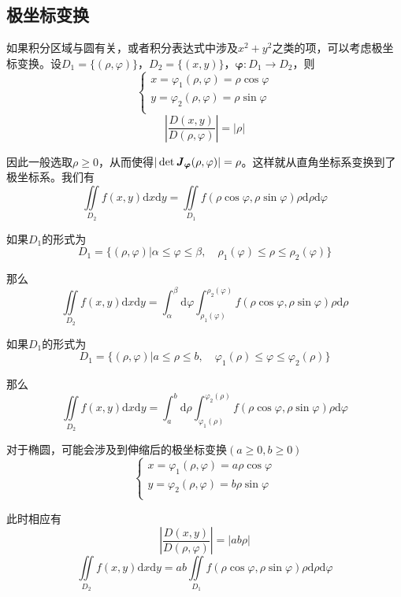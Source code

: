 \documentclass[UTF8,openany]{book}
\begin{document}
	\subsection{极坐标变换}
	如果积分区域与圆有关，或者积分表达式中涉及$x^2+y^2$之类的项，可以考虑极坐标变换。设$D_1=\{(\rho,\varphi)\}$，$D_2=\{(x,y)\}$，$\boldsymbol{\varphi}:D_1\rightarrow D_2$，则
	$$\begin{cases}
	x=\varphi_1(\rho,\varphi)=\rho\cos\varphi\\
	y=\varphi_2(\rho,\varphi)=\rho\sin\varphi\\
	\end{cases}$$
	$$\left|\frac{D(x,y)}{D(\rho,\varphi)}\right|=|\rho|$$
	\par 因此一般选取$\rho\geqslant0$，从而使得$|\det\textbf{\textit{J}}_{\boldsymbol{\varphi}}(\rho,\varphi)|=\rho$。这样就从直角坐标系变换到了极坐标系。我们有
	$$\iint\limits_{D_2}f(x,y)\mathrm{d}x\mathrm{d}y=
	\iint\limits_{D_1}f(\rho\cos\varphi,\rho\sin\varphi)\rho\mathrm{d}\rho\mathrm{d}\varphi$$
	\par 如果$D_1$的形式为
	$$D_1=\{(\rho,\varphi)|\alpha\leqslant\varphi\leqslant\beta,\quad\rho_1(\varphi)\leqslant\rho\leqslant\rho_2(\varphi)\}$$
	\par 那么
	$$\iint\limits_{D_2}f(x,y)\mathrm{d}x\mathrm{d}y=
	\int_{\alpha}^{\beta}\mathrm{d}\varphi\int_{\rho_1(\varphi)}^{\rho_2(\varphi)}f(\rho\cos\varphi,\rho\sin\varphi)\rho\mathrm{d}\rho$$
	\par 如果$D_1$的形式为
	$$D_1=\{(\rho,\varphi)|a\leqslant\rho\leqslant b,\quad\varphi_1(\rho)\leqslant\varphi\leqslant\varphi_2(\rho)\}$$
	\par 那么
	$$\iint\limits_{D_2}f(x,y)\mathrm{d}x\mathrm{d}y=
	\int_{a}^{b}\mathrm{d}\rho\int_{\varphi_1(\rho)}^{\varphi_2(\rho)}f(\rho\cos\varphi,\rho\sin\varphi)\rho\mathrm{d}\varphi$$
	\par 对于椭圆，可能会涉及到伸缩后的极坐标变换$(a\geqslant0,b\geqslant0)$
	$$\begin{cases}
	x=\varphi_1(\rho,\varphi)=a\rho\cos\varphi\\
	y=\varphi_2(\rho,\varphi)=b\rho\sin\varphi\\
	\end{cases}$$
	\par 此时相应有
	$$\left|\frac{D(x,y)}{D(\rho,\varphi)}\right|=|ab\rho|$$
	$$\iint\limits_{D_2}f(x,y)\mathrm{d}x\mathrm{d}y=
	ab\iint\limits_{D_1}f(\rho\cos\varphi,\rho\sin\varphi)\rho\mathrm{d}\rho\mathrm{d}\varphi$$
\end{document}
